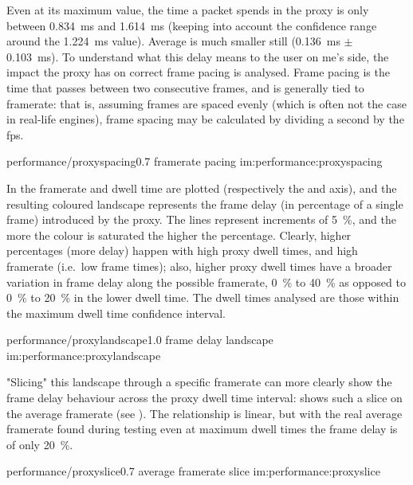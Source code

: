 Even at its maximum value, the time a packet spends in the proxy is only between \SI{0,834}{\milli\second} and \SI{1,614}{\milli\second} (keeping into account the confidence range around the \SI{1,224}{\milli\second} value). Average is much smaller still (\SI{0,136}{\milli\second} $\pm$ \SI{0,103}{\milli\second}). To understand what this delay means to the user on \gls{me}'s side, the impact the proxy has on correct frame pacing is analysed. Frame pacing is the time that passes between two consecutive frames, and is generally tied to \gls{framerate}: that is, assuming frames are spaced evenly (which is often not the case in real-life engines), frame spacing may be calculated by dividing a second by the \gls{fps}.

\begin{image}
	{performance/proxyspacing}{0.7}
	{\gls{framerate} pacing}
	{im:performance:proxyspacing}
	{}
\end{image}

In  the \gls{framerate} and dwell time are plotted (respectively the  and  axis), and the resulting coloured landscape represents the frame delay (in percentage of a single frame) introduced by the proxy. The lines represent increments of \SI{5}{\percent}, and the more the colour is saturated the higher the percentage. Clearly, higher percentages (more delay) happen with high proxy dwell times, and high \gls{framerate} (i.e.\ low frame times); also, higher proxy dwell times have a broader variation in frame delay along the possible \gls{framerate}, \SI{0}{\percent} to \SI{40}{\percent} as opposed to \SI{0}{\percent} to \SI{20}{\percent} in the lower dwell time. The dwell times analysed are those within the maximum dwell time confidence interval.

\begin{image}
	{performance/proxylandscape}{1.0}
	{frame delay landscape}
	{im:performance:proxylandscape}
	{}
\end{image}

"Slicing" this landscape through a specific \gls{framerate} can more clearly show the frame delay behaviour across the proxy dwell time interval:  shows such a slice on the average \gls{framerate} (see ). The relationship is linear, but with the real average framerate found during testing even at maximum dwell times the frame delay is of only \SI{20}{\percent}.

\begin{image}
	{performance/proxyslice}{0.7}
	{average \gls{framerate} slice}
	{im:performance:proxyslice}
	{}
\end{image}

